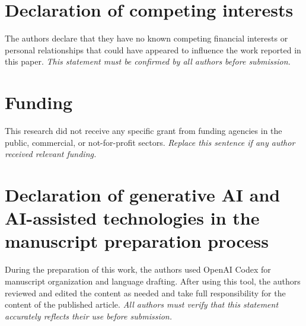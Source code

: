 \documentclass[11pt]{article}
\begin{document}
\section*{Declaration of competing interests}
The authors declare that they have no known competing financial interests or personal relationships that could have appeared to influence the work reported in this paper. \textit{This statement must be confirmed by all authors before submission.}

\section*{Funding}
This research did not receive any specific grant from funding agencies in the public, commercial, or not-for-profit sectors. \textit{Replace this sentence if any author received relevant funding.}

\section*{Declaration of generative AI and AI-assisted technologies in the manuscript preparation process}
During the preparation of this work, the authors used OpenAI Codex for manuscript organization and language drafting. After using this tool, the authors reviewed and edited the content as needed and take full responsibility for the content of the published article. \textit{All authors must verify that this statement accurately reflects their use before submission.}

\printbibliography
\end{document}
